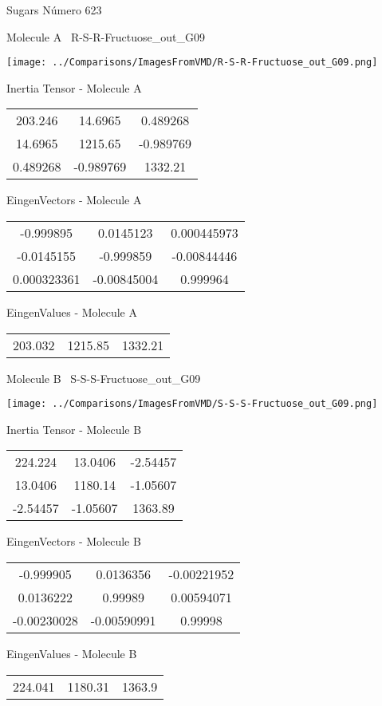 \vtab[-3cm]
\begin{center}
{\large Sugars \tab Número 623}
\end{center}
\begin{multicols}{2}
\begin{center}

Molecule A \
R-S-R-Fructuose\_out\_G09

\texttt{[image: ../Comparisons/ImagesFromVMD/R-S-R-Fructuose\_out\_G09.png]}

Inertia Tensor - Molecule A \\
\begin{tabular}{|c c c|}
203.246	 & 	14.6965	 & 	0.489268	 \\
14.6965	 & 	1215.65	 & 	-0.989769	 \\
0.489268	 & 	-0.989769	 & 	1332.21
\end{tabular}

\vtab
 EingenVectors - Molecule A     \\
\begin{tabular}{|c c c|}
-0.999895	 & 	0.0145123	 & 	0.000445973	 \\
-0.0145155	 & 	-0.999859	 & 	-0.00844446	 \\
0.000323361	 & 	-0.00845004	 & 	0.999964
\end{tabular}

\vtab
 EingenValues - Molecule A     \\
\begin{tabular}{|c c c|}
203.032	 & 	1215.85	 & 	1332.21	 \\
\end{tabular}
\columnbreak

Molecule B \
S-S-S-Fructuose\_out\_G09

\texttt{[image: ../Comparisons/ImagesFromVMD/S-S-S-Fructuose\_out\_G09.png]}

Inertia Tensor - Molecule B \\
\begin{tabular}{|c c c|}
224.224	 & 	13.0406	 & 	-2.54457	 \\
13.0406	 & 	1180.14	 & 	-1.05607	 \\
-2.54457	 & 	-1.05607	 & 	1363.89
\end{tabular}

\vtab
 EingenVectors - Molecule B     \\
\begin{tabular}{|c c c|}
-0.999905	 & 	0.0136356	 & 	-0.00221952	 \\
0.0136222	 & 	0.99989	 & 	0.00594071	 \\
-0.00230028	 & 	-0.00590991	 & 	0.99998
\end{tabular}

\vtab
 EingenValues - Molecule B     \\
\begin{tabular}{|c c c|}
224.041	 & 	1180.31	 & 	1363.9	 \\
\end{tabular}

\end{center}
\end{multicols}

